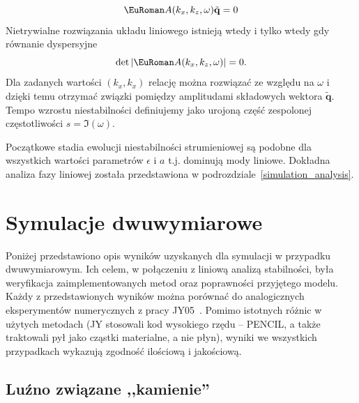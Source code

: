 \begin{equation}
 \eurom{A}(k_x,k_z,\omega)\tilde{\mathbf{q}} = 0
 \label{eq:linset}
\end{equation}
%
Nietrywialne rozwiązania układu liniowego  istnieją wtedy i tylko
wtedy gdy równanie dyspersyjne 
\begin{equation}
 \det|\eurom{A}(k_x,k_z,\omega)|=0.
 \label{eq:disprel}
\end{equation}
%
Dla zadanych wartości $(k_x, k_x)$ relację  można rozwiązać ze
względu na $\omega$ i dzięki temu otrzymać związki pomiędzy amplitudami
składowych wektora $\tilde{\mathbf{q}}$.
Tempo wzrostu niestabilności definiujemy jako urojoną część zespolonej
częstotliwości $s=\Im(\omega)$.
%

Początkowe stadia ewolucji niestabilności strumieniowej są podobne dla
wszystkich wartości parametrów $\epsilon$ i $a$ t.j. dominują mody liniowe.
Dokładna analiza fazy liniowej została przedstawiona w
podrozdziale~\ref{simulation_analysis}.


\section{Symulacje dwuwymiarowe}
Poniżej przedstawiono opis wyników uzyskanych dla symulacji w przypadku
dwuwymiarowym. Ich celem, w połączeniu z liniową analizą stabilności, była
weryfikacja zaimplementowanych metod oraz poprawności przyjętego modelu. Każdy z
przedstawionych wyników można porównać do analogicznych eksperymentów
numerycznych z pracy JY05~\cite{JY05}. Pomimo istotnych różnic w użytych
metodach (JY stosowali kod wysokiego rzędu -- PENCIL, a także traktowali pył
jako cząstki materialne, a nie płyn), wyniki we wszystkich przypadkach wykazują
zgodność ilościową i jakościową.

\subsection{Luźno związane ,,kamienie''}%

